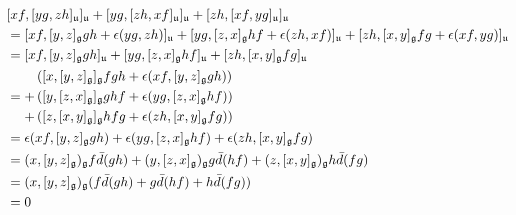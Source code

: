             $$
                \begin{aligned}
                    & [xf, [yg, zh]_{\mathfrak{u}}]_{\mathfrak{u}} + [yg, [zh, xf]_{\mathfrak{u}}]_{\mathfrak{u}} + [zh, [xf, yg]_{\mathfrak{u}}]_{\mathfrak{u}}
                    \\
                    & = [xf, [y, z]_{\mathfrak{g}} gh + \epsilon(yg, zh)]_{\mathfrak{u}} + [yg, [z, x]_{\mathfrak{g}} hf + \epsilon(zh, xf)]_{\mathfrak{u}} + [zh, [x, y]_{\mathfrak{g}} fg + \epsilon(xf, yg)]_{\mathfrak{u}}
                    \\
                    & = [xf, [y, z]_{\mathfrak{g}} gh]_{\mathfrak{u}} + [yg, [z, x]_{\mathfrak{g}} hf]_{\mathfrak{u}} + [zh, [x, y]_{\mathfrak{g}} fg]_{\mathfrak{u}}
                    \\
                    & = 
                    \begin{aligned}
                        & \left( [x, [y, z]_{\mathfrak{g}}]_{\mathfrak{g}} fgh + \epsilon(xf, [y, z]_{\mathfrak{g}} gh) \right)
                        \\
                        + & \left( [y, [z, x]_{\mathfrak{g}}]_{\mathfrak{g}} ghf + \epsilon(yg, [z, x]_{\mathfrak{g}} hf) \right)
                        \\
                        + & \left( [z, [x, y]_{\mathfrak{g}}]_{\mathfrak{g}} hfg + \epsilon(zh, [x, y]_{\mathfrak{g}} fg) \right)
                    \end{aligned}
                    \\
                    & = \epsilon(xf, [y, z]_{\mathfrak{g}} gh) + \epsilon(yg, [z, x]_{\mathfrak{g}} hf) + \epsilon(zh, [x, y]_{\mathfrak{g}} fg)
                    \\
                    & = (x, [y, z]_{\mathfrak{g}})_{\mathfrak{g}} f \bar{d}(gh) + (y, [z, x]_{\mathfrak{g}})_{\mathfrak{g}} g \bar{d}(hf) + (z, [x, y]_{\mathfrak{g}})_{\mathfrak{g}} h \bar{d}(fg)
                    \\
                    & = (x, [y, z]_{\mathfrak{g}})_{\mathfrak{g}} ( f \bar{d}(gh) + g \bar{d}(hf) + h \bar{d}(fg) )
                    \\
                    & = 0
                \end{aligned}
            $$
